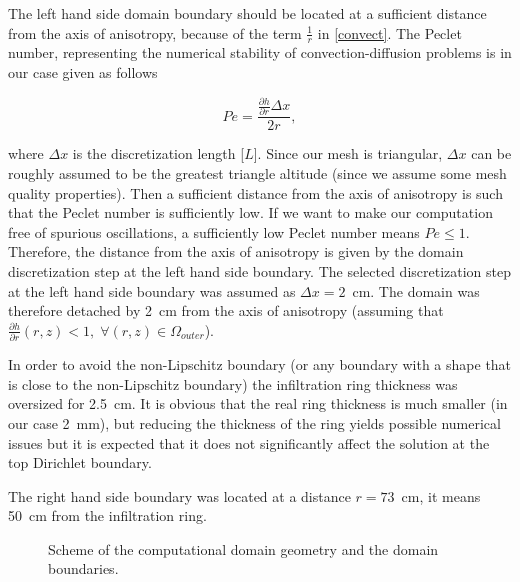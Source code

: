 \documentclass[review]{myarticle}
\newenvironment{lineq}
    {\begin{linenomath*}
    \begin{equation}
    }
    { 
    \end{equation} 
    \end{linenomath*}
    }
\begin{document}
The left hand side domain boundary should be located at a sufficient distance from the axis of anisotropy, because of the term $\frac{1}{r}$ in \eqref{convect}. The Peclet number, representing the numerical stability of convection-diffusion problems is in our case given as follows
\begin{lineq}
Pe = \frac{\frac{\partial h}{\partial r} \Delta x}{2r},
\end{lineq}
where $\Delta x$ is the discretization length [$L$]. Since our mesh is triangular,  $\Delta x$ can be roughly assumed to be the greatest triangle altitude (since we assume some mesh quality properties). Then a sufficient distance from the axis of anisotropy is such that the Peclet number is sufficiently low. If we want to make our computation free of spurious oscillations, a sufficiently low Peclet number means $Pe\le 1$. Therefore, the distance from the axis of anisotropy is given by the domain discretization step at the left hand side boundary.  The selected discretization step at the left hand side boundary was assumed as $\Delta x=2$~cm. The domain was therefore detached by 2~cm from the axis of anisotropy (assuming that $\frac{\partial h}{\partial r} (r,z) < 1, \; \forall (r,z) \in \Omega_{outer}$).

In order to avoid the non-Lipschitz boundary (or any boundary with a shape that is close to the non-Lipschitz boundary) the infiltration ring thickness was oversized  for 2.5~cm. It is obvious that the real ring thickness is much smaller (in our case 2~mm), but reducing the  thickness of the ring yields possible numerical issues but it is expected that it does not significantly affect the solution at the top Dirichlet boundary.

The right hand side boundary was located at a distance $r=73$~cm, it means 50~cm from the infiltration ring. 

 \begin{figure}
\centering
{}
 \caption{Scheme of the computational domain geometry and the domain boundaries.}
 \label{valecbc}
\end{figure}
\end{document}
